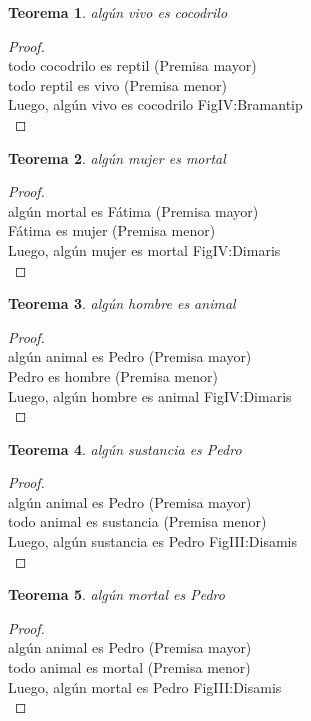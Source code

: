 ﻿\documentclass[12pt]{book}
\newtheorem{theorem}{Teorema}[chapter]
\newtheorem{proof}{Demostración}
\begin{document}
\begin{theorem}
algún vivo es cocodrilo
\label{th: 79}
\end{theorem}\begin{proof}\\todo cocodrilo es reptil	 (Premisa mayor) \\todo reptil es vivo	 (Premisa menor) \\Luego, algún vivo es cocodrilo	FigIV:Bramantip \\ \end{proof}
\begin{theorem}
algún mujer es mortal
\label{th: 80}
\end{theorem}\begin{proof}\\algún mortal es Fátima	 (Premisa mayor) \\Fátima es mujer	 (Premisa menor) \\Luego, algún mujer es mortal	FigIV:Dimaris \\ \end{proof}
\begin{theorem}
algún hombre es animal
\label{th: 81}
\end{theorem}\begin{proof}\\algún animal es Pedro	 (Premisa mayor) \\Pedro es hombre	 (Premisa menor) \\Luego, algún hombre es animal	FigIV:Dimaris \\ \end{proof}
\begin{theorem}
algún sustancia es Pedro
\label{th: 82}
\end{theorem}\begin{proof}\\algún animal es Pedro	 (Premisa mayor) \\todo animal es sustancia	 (Premisa menor) \\Luego, algún sustancia es Pedro	FigIII:Disamis \\ \end{proof}
\begin{theorem}
algún mortal es Pedro
\label{th: 83}
\end{theorem}\begin{proof}\\algún animal es Pedro	 (Premisa mayor) \\todo animal es mortal	 (Premisa menor) \\Luego, algún mortal es Pedro	FigIII:Disamis \\ \end{proof}
\end{document}
